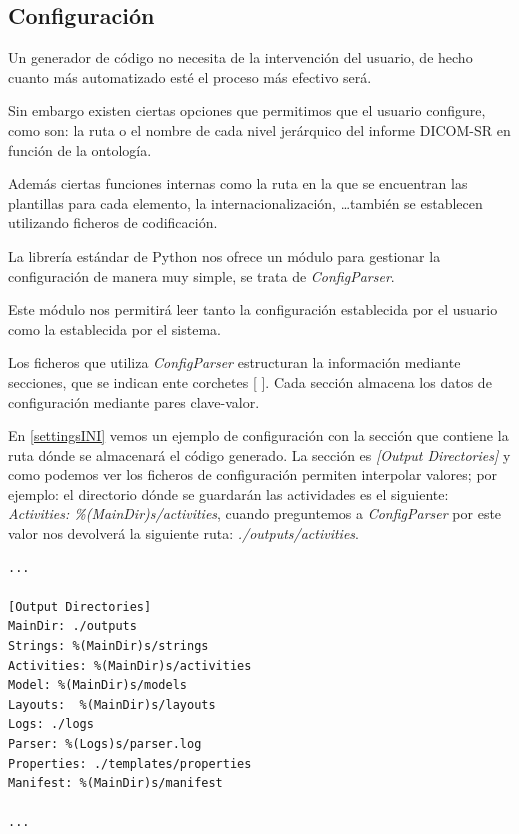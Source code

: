 \subsection{Configuración}\label{sec:configuracion}
Un generador de código no necesita de la intervención del usuario, de hecho cuanto más automatizado esté el proceso más efectivo será.\par
Sin embargo existen ciertas opciones que permitimos que el usuario configure, como son: la ruta o el nombre de cada nivel jerárquico del informe DICOM-SR en función de la ontología. \par
Además ciertas funciones internas como la ruta en la que se encuentran las plantillas para cada elemento, la internacionalización, \ldots también se establecen utilizando ficheros de codificación.\medskip\par
La librería estándar de Python nos ofrece un módulo para gestionar la configuración de manera muy simple, se trata de \emph{ConfigParser}.\par
Este módulo nos permitirá leer tanto la configuración establecida por el  usuario como la establecida por el sistema.\par
Los ficheros que utiliza \emph{ConfigParser} estructuran la información mediante secciones, que se indican ente corchetes [ ]. Cada sección almacena los datos de configuración mediante pares clave-valor.\par
En \ref{settingsINI} vemos un ejemplo de configuración con la sección que contiene la ruta dónde se almacenará el código generado. La sección es \emph{[Output Directories]} y como podemos ver los ficheros de configuración permiten interpolar valores; por ejemplo: el directorio dónde se guardarán las actividades es el siguiente: \emph{Activities: \%(MainDir)s/activities}, cuando preguntemos a \emph{ConfigParser} por este valor nos devolverá la siguiente ruta: \emph{./outputs/activities}.\par

\begin{lstlisting}[label=settingsINI,caption=Sección del fichero de configuración]
...

[Output Directories]
MainDir: ./outputs
Strings: %(MainDir)s/strings
Activities: %(MainDir)s/activities
Model: %(MainDir)s/models
Layouts:  %(MainDir)s/layouts
Logs: ./logs
Parser: %(Logs)s/parser.log
Properties: ./templates/properties
Manifest: %(MainDir)s/manifest

...
\end{lstlisting}

